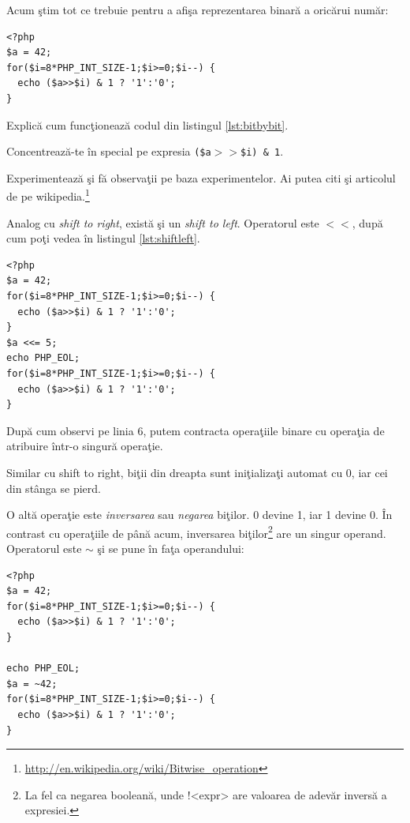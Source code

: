 Acum ştim tot ce trebuie pentru a afişa reprezentarea binară a oricărui număr:
\begin{lstlisting}[label=lst:bitbybit,caption={Afişarea bit cu bit a unui int}]
<?php
$a = 42;
for($i=8*PHP_INT_SIZE-1;$i>=0;$i--) {
  echo ($a>>$i) & 1 ? '1':'0';
}
\end{lstlisting}


\begin{Exercise}[difficulty=3,title={Cum funcţionează afişarea bit cu bit a unui int?}]
Explică cum funcţionează codul din listingul \ref{lst:bitbybit}.

Concentrează-te
în special pe expresia \texttt{(\$a$>>$\$i) \& 1}.

Experimentează şi fă observaţii pe baza experimentelor. Ai putea citi şi articolul
de pe wikipedia.\footnote{\url{http://en.wikipedia.org/wiki/Bitwise_operation}}
\end{Exercise}

Analog cu \textit{shift to right}, există şi un \textsl{shift to left}. Operatorul este
\texttt{$<<$}, după cum poţi vedea \^in listingul \ref{lst:shiftleft}.
\begin{lstlisting}[label=lst:shiftleft,caption={Operatorul shift to left}]
<?php
$a = 42;
for($i=8*PHP_INT_SIZE-1;$i>=0;$i--) {
  echo ($a>>$i) & 1 ? '1':'0';
}
$a <<= 5;
echo PHP_EOL;
for($i=8*PHP_INT_SIZE-1;$i>=0;$i--) {
  echo ($a>>$i) & 1 ? '1':'0';
}
\end{lstlisting}
După cum observi pe linia 6, putem contracta operaţiile binare cu operaţia de atribuire
într-o singură operaţie.

Similar cu shift to right, biţii din dreapta sunt iniţializaţi automat cu 0, iar cei din
stânga se pierd. 

O altă operaţie este \textsl{inversarea} sau \textsl{negarea} biţilor. 0 devine 1, iar 1 devine 0.
În contrast cu operaţiile de până acum, inversarea biţilor\footnote{La fel ca negarea
booleană, unde !<expr> are valoarea de adevăr inversă a expresiei.} are un singur operand.
Operatorul este $\sim$ şi se pune în faţa operandului: 
\begin{lstlisting}
<?php
$a = 42;
for($i=8*PHP_INT_SIZE-1;$i>=0;$i--) {
  echo ($a>>$i) & 1 ? '1':'0';
}

echo PHP_EOL;
$a = ~42;
for($i=8*PHP_INT_SIZE-1;$i>=0;$i--) {
  echo ($a>>$i) & 1 ? '1':'0';
}
\end{lstlisting}

